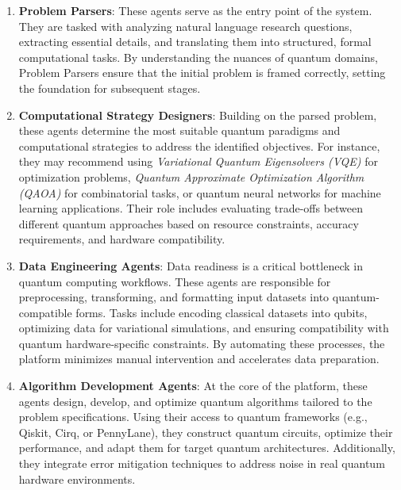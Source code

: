 \documentclass[12pt]{article}
\begin{document}
\begin{enumerate}
    \item \textbf{Problem Parsers}: These agents serve as the entry point of the system. They are tasked with analyzing natural language research questions, extracting essential details, and translating them into structured, formal computational tasks. By understanding the nuances of quantum domains, Problem Parsers ensure that the initial problem is framed correctly, setting the foundation for subsequent stages.

    \item \textbf{Computational Strategy Designers}: Building on the parsed problem, these agents determine the most suitable quantum paradigms and computational strategies to address the identified objectives. For instance, they may recommend using \textit{Variational Quantum Eigensolvers (VQE)} for optimization problems, \textit{Quantum Approximate Optimization Algorithm (QAOA)} for combinatorial tasks, or quantum neural networks for machine learning applications. Their role includes evaluating trade-offs between different quantum approaches based on resource constraints, accuracy requirements, and hardware compatibility.

    \item \textbf{Data Engineering Agents}: Data readiness is a critical bottleneck in quantum computing workflows. These agents are responsible for preprocessing, transforming, and formatting input datasets into quantum-compatible forms. Tasks include encoding classical datasets into qubits, optimizing data for variational simulations, and ensuring compatibility with quantum hardware-specific constraints. By automating these processes, the platform minimizes manual intervention and accelerates data preparation.

    \item \textbf{Algorithm Development Agents}: At the core of the platform, these agents design, develop, and optimize quantum algorithms tailored to the problem specifications. Using their access to quantum frameworks (e.g., Qiskit, Cirq, or PennyLane), they construct quantum circuits, optimize their performance, and adapt them for target quantum architectures. Additionally, they integrate error mitigation techniques to address noise in real quantum hardware environments.
\end{enumerate}
\end{document}

